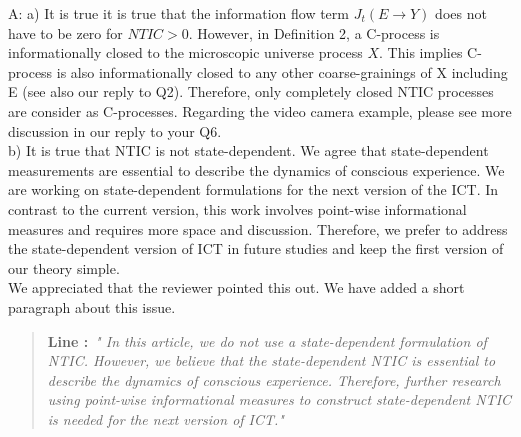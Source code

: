 \documentclass[utf8]{article}
\newenvironment{ans}  
    {\color{Black}\noindent A:}
    {~\newline}
\newcommand{\addnew}[2]{\blockcquote{}{\textbf{Line #1:}~\newline\textit{"#2"}}
}
\begin{document}
    	\begin{ans}
    		\newline
    		a) It is true it is true that the information flow term $J_t(E\rightarrow Y)$ does not have to be zero for $NTIC>0$. However, in Definition 2, a C-process is informationally closed to the microscopic universe process $X$. This implies C-process is also informationally closed to any other coarse-grainings of X including E (see also our reply to Q2). Therefore, only completely closed NTIC processes are consider as C-processes. 
    		Regarding the video camera example, please see more discussion in our reply to your Q6. \\
    		

            		
    		\noindent
    		b) It is true that NTIC is not state-dependent. We agree that state-dependent measurements are essential to describe the dynamics of conscious experience. We are  working on state-dependent formulations for the next version of the ICT. In contrast to the current version, this work involves point-wise informational measures and requires more space and discussion. Therefore, we prefer to address the state-dependent version of ICT in future studies and keep the first version of our theory simple.\\
    		We appreciated that the reviewer pointed this out. We have added a short paragraph about this issue.
    	
	    	\addnew{}{
	    		In this article, we do not use a state-dependent formulation of NTIC. However, we believe that the state-dependent NTIC is essential to describe the dynamics of conscious experience. Therefore, further research using point-wise informational measures to construct state-dependent NTIC is needed for the next version of ICT.}

    	\end{ans}
        
\end{document}
